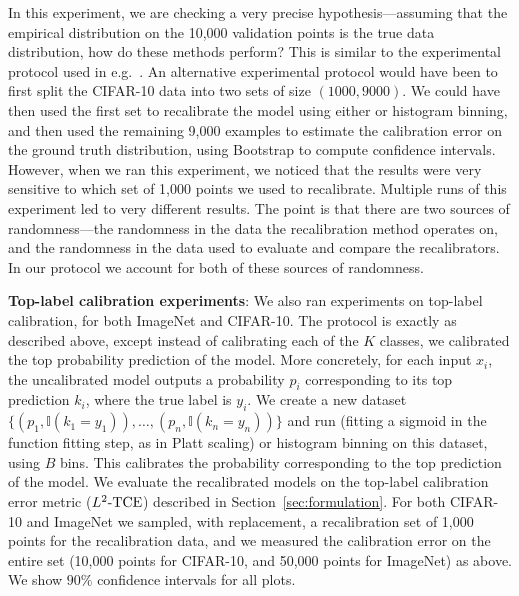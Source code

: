 In this experiment, we are checking a very precise hypothesis---assuming that the empirical distribution on the 10,000 validation points is the true data distribution, how do these methods perform? This is similar to the experimental protocol used in e.g.~\cite{brocker2012empirical}.
An alternative experimental protocol would have been to first split the CIFAR-10 data into two sets of size $(1000, 9000)$.
We could have then used the first set to recalibrate the model using either \ourcal{} or histogram binning, and then used the remaining 9,000 examples to estimate the calibration error on the ground truth distribution, using Bootstrap to compute confidence intervals.
However, when we ran this experiment, we noticed that the results were very sensitive to which set of 1,000 points we used to recalibrate.
Multiple runs of this experiment led to very different results.
The point is that there are two sources of randomness---the randomness in the data the recalibration method operates on, and the randomness in the data used to evaluate and compare the recalibrators.
In our protocol we account for both of these sources of randomness.

\textbf{Top-label calibration experiments}: We also ran experiments on top-label calibration, for both ImageNet and CIFAR-10. The protocol is exactly as described above, except instead of calibrating each of the $K$ classes, we calibrated the top probability prediction of the model. More concretely, for each input $x_i$, the uncalibrated model outputs a probability $p_i$ corresponding to its top prediction $k_i$, where the true label is $y_i$. We create a new dataset $\{(p_1, \mathbb{I}(k_1 = y_1)), \dots, (p_n, \mathbb{I}(k_n = y_n))\}$ and run \ourcal{} (fitting a sigmoid in the function fitting step, as in Platt scaling) or histogram binning on this dataset, using $B$ bins. This calibrates the probability corresponding to the top prediction of the model. We evaluate the recalibrated models on the top-label calibration error metric ($L^2\textup{-TCE}{}$) described in Section~\ref{sec:formulation}. For both CIFAR-10 and ImageNet we sampled, with replacement, a recalibration set of 1,000 points for the recalibration data, and we measured the calibration error on the entire set (10,000 points for CIFAR-10, and 50,000 points for ImageNet) as above. We show $90\%$ confidence intervals for all plots.


